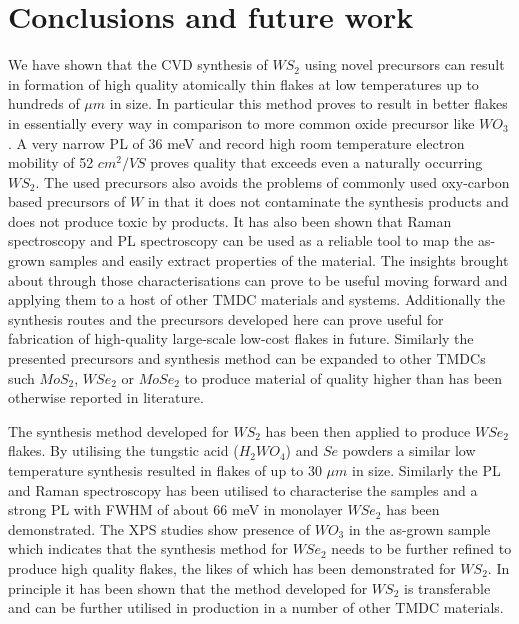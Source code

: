 \chapter{Conclusions and future work} 

We have shown that the CVD synthesis of $WS_2$ using novel precursors can result in formation of high quality atomically thin flakes at low temperatures up to hundreds of $\mu m$ in size. In particular this method proves to result in better flakes in essentially every way in comparison to more common oxide precursor like $WO_3$. A very narrow PL of 36 meV and record high room temperature electron mobility of 52 $cm^2/VS$ proves quality that exceeds even a naturally occurring $WS_2$. The used precursors also avoids the problems of commonly used oxy-carbon based precursors of $W$ in that it does not contaminate the synthesis products and does not produce toxic by products. It has also been shown that Raman spectroscopy and PL spectroscopy can be used as a reliable tool to map the as-grown samples and easily extract properties of the material. The insights brought about through those characterisations can prove to be useful moving forward and applying them to a host of other TMDC materials and systems. Additionally the synthesis routes and the precursors developed here can prove useful for fabrication of high-quality large-scale low-cost flakes in future. Similarly the presented precursors and synthesis method can be expanded to other TMDCs such $MoS_2$, $WSe_2$ or $MoSe_2$ to produce material of quality higher than has been otherwise reported in literature.

The synthesis method developed for $WS_2$ has been then applied to produce $WSe_2$ flakes. By utilising the tungstic acid ($H_2WO_4$) and $Se$ powders a similar low temperature synthesis resulted in flakes of up to 30 $\mu m$ in size. Similarly the PL and Raman spectroscopy has been utilised to characterise the samples and a strong PL with FWHM of about 66 meV in monolayer $WSe_2$ has been demonstrated. The XPS studies show presence of $WO_3$ in the as-grown sample which indicates that the synthesis method for $WSe_2$ needs to be further refined to produce high quality flakes, the likes of which has been demonstrated for $WS_2$. In principle it has been shown that the method developed for $WS_2$ is transferable and can be further utilised in production in a number of other TMDC materials. 

